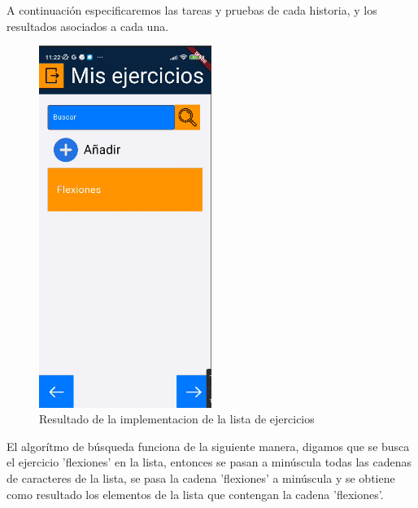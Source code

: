 A continuación especificaremos las tareas y pruebas de cada historia, y los resultados asociados a cada una. 


\begin{figure}[H]
   \centering
    \includegraphics[width=0.5\textwidth]{pantallas/listaEjercicios.png}
    \caption{Resultado de la implementacion de la lista de ejercicios}
    \label{fig:ListaEjer}
\end{figure}

El algorítmo de búsqueda funciona de la siguiente manera, digamos que se busca el ejercicio 'flexiones' en la lista, entonces se pasan a minúscula todas las cadenas de caracteres de la lista, se pasa la cadena 'flexiones' a minúscula y se obtiene como resultado los elementos de la lista que contengan la cadena 'flexiones'.

